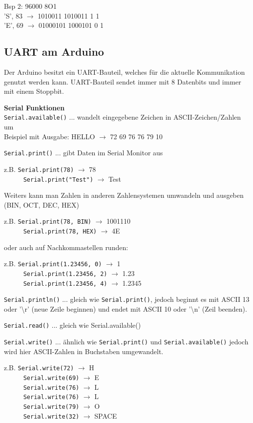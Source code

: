 Bsp 2: 96000 8O1 \\
'S', 83 $\rightarrow$ 1010011  1010011 1 1 \\
'E', 69 $\rightarrow$ 01000101  1000101 0 1

\subsection*{UART am Arduino}
Der Arduino besitzt ein UART-Bauteil, welches für die aktuelle Kommunikation genutzt werden kann. UART-Bauteil sendet immer mit 8 Datenbits und immer mit einem Stoppbit.

\textbf{Serial Funktionen} \\
\texttt{Serial.available()} ... wandelt eingegebene Zeichen in ASCII-Zeichen/Zahlen um \\
Beispiel mit Ausgabe: HELLO $\rightarrow$ 72 69 76 76 79 10

\texttt{Serial.print()} ... gibt Daten im Serial Monitor aus
\begin{tabbing}
	z.B. \= \texttt{Serial.print(78)} $\rightarrow$ 78 \\
	~~~~~ \= \texttt{Serial.print("Test")} $\rightarrow$ Test 
\end{tabbing}
Weiters kann man Zahlen in anderen Zahlensystemen umwandeln und ausgeben (BIN, OCT, DEC, HEX) 
\begin{tabbing}
	z.B. \= \texttt{Serial.print(78, BIN)} $\rightarrow$ 1001110 \\
	~~~~~ \= \texttt{Serial.print(78, HEX)} $\rightarrow$ 4E 
\end{tabbing}
oder auch auf Nachkommastellen runden:
\begin{tabbing}
	z.B. \= \texttt{Serial.print(1.23456, 0)} $\rightarrow$ 1 \\
	~~~~~ \= \texttt{Serial.print(1.23456, 2)} $\rightarrow$ 1.23 \\
	~~~~~ \= \texttt{Serial.print(1.23456, 4)} $\rightarrow$ 1.2345
\end{tabbing}

\texttt{Serial.println()} ... gleich wie \texttt{Serial.print()}, jedoch beginnt es mit ASCII 13 oder '\textbackslash r' (neue Zeile beginnen) und endet mit ASCII 10 oder '\textbackslash n' (Zeil beenden).

\texttt{Serial.read()} ... gleich wie Serial.available()

\texttt{Serial.write()} ... ähnlich wie \texttt{Serial.print()} und \texttt{Serial.available()} jedoch wird hier ASCII-Zahlen in Buchstaben umgewandelt.
\begin{tabbing}
	z.B. \= \texttt{Serial.write(72)} $\rightarrow$ H \\
	~~~~~ \= \texttt{Serial.write(69)} $\rightarrow$ E \\
	~~~~~ \= \texttt{Serial.write(76)} $\rightarrow$ L \\
	~~~~~ \= \texttt{Serial.write(76)} $\rightarrow$ L \\
	~~~~~ \= \texttt{Serial.write(79)} $\rightarrow$ O \\
	~~~~~ \= \texttt{Serial.write(32)} $\rightarrow$ SPACE
\end{tabbing}

